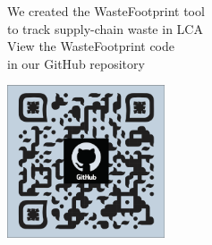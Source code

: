 \documentclass[a0paper,fleqn]{betterposter}
\begin{document}
{{\begin{minipage}{0.60\textwidth}
            \vspace{270pt}
            \begin{center}
            \begin{spacing}{3}
            {\fontsize{46}{40}\selectfont We created the WasteFootprint tool}\\
            {\fontsize{46}{40}\selectfont to track supply-chain waste in LCA}\\
            \vspace{60pt}
            {\fontsize{36}{40}\selectfont View the WasteFootprint code}\\
            {\fontsize{36}{40}\selectfont  in our GitHub repository}
            \end{spacing}
            \vspace{220pt}
            \includegraphics[width=0.35\textwidth]{img/qr.svg.eps}
            \end{center}
            \end{minipage}

}}
\end{document}
